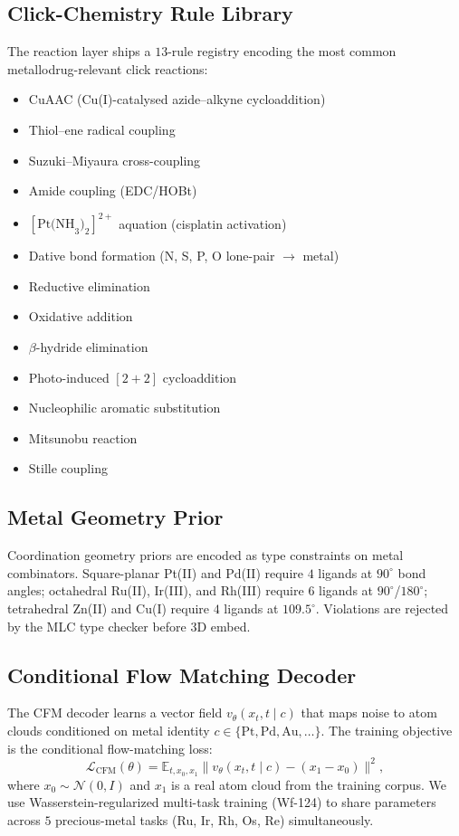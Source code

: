 \subsection{Click-Chemistry Rule Library}
\label{sec:click-rules}

The reaction layer ships a $13$-rule registry encoding the most common
metallodrug-relevant click reactions:

\begin{itemize}
  \item CuAAC (Cu(I)-catalysed azide--alkyne cycloaddition)
  \item Thiol--ene radical coupling
  \item Suzuki--Miyaura cross-coupling
  \item Amide coupling (EDC/HOBt)
  \item $[\text{Pt(NH}_3\text{)}_2]^{2+}$ aquation (cisplatin activation)
  \item Dative bond formation (N, S, P, O lone-pair $\to$ metal)
  \item Reductive elimination
  \item Oxidative addition
  \item $\beta$-hydride elimination
  \item Photo-induced $[2+2]$ cycloaddition
  \item Nucleophilic aromatic substitution
  \item Mitsunobu reaction
  \item Stille coupling
\end{itemize}

\subsection{Metal Geometry Prior}
\label{sec:metal-prior}

Coordination geometry priors are encoded as type constraints on metal
combinators.  Square-planar Pt(II) and Pd(II) require $4$ ligands at $90^\circ$
bond angles; octahedral Ru(II), Ir(III), and Rh(III) require $6$ ligands at
$90^\circ$/$180^\circ$; tetrahedral Zn(II) and Cu(I) require $4$ ligands at
$109.5^\circ$.  Violations are rejected by the MLC type checker before
3D embed.

\subsection{Conditional Flow Matching Decoder}
\label{sec:cfm}

The CFM decoder learns a vector field $v_\theta(x_t, t \mid c)$ that maps
noise to atom clouds conditioned on metal identity $c \in \{\text{Pt},
\text{Pd}, \text{Au}, \dots\}$.  The training objective is the conditional
flow-matching loss:
\[
  \mathcal{L}_{\text{CFM}}(\theta) = \mathbb{E}_{t, x_0, x_1}
    \| v_\theta(x_t, t \mid c) - (x_1 - x_0) \|^2 ,
\]
where $x_0 \sim \mathcal{N}(0, I)$ and $x_1$ is a real atom cloud from the
training corpus.  We use Wasserstein-regularized multi-task training
(Wf-124) to share parameters across $5$ precious-metal tasks (Ru, Ir, Rh, Os,
Re) simultaneously.

